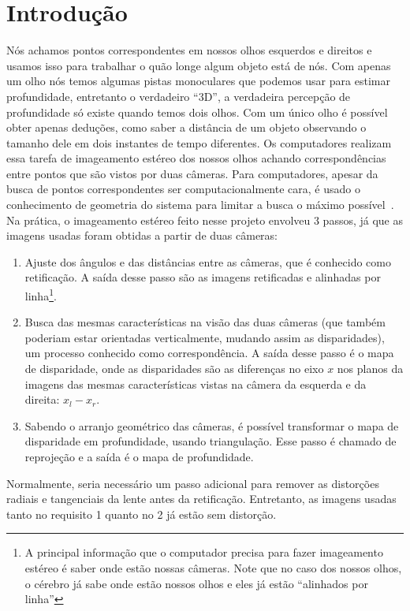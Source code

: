 \documentclass{bmvc2k}
\begin{document}
\section{Introdução}
\label{sec:intro}
Nós achamos pontos correspondentes em nossos olhos esquerdos e direitos e usamos isso para trabalhar o quão longe algum objeto está de nós. Com apenas um olho nós temos algumas pistas monoculares que podemos usar para estimar profundidade, entretanto o verdadeiro ``3D'', a verdadeira percepção de profundidade só existe quando temos dois olhos. Com um único olho é possível obter apenas deduções, como saber a distância de um objeto observando o tamanho dele em dois instantes de tempo diferentes. Os computadores realizam essa tarefa de imageamento estéreo dos nossos olhos achando correspondências entre pontos que são vistos por duas câmeras. Para computadores, apesar da busca de pontos correspondentes ser computacionalmente cara, é usado o conhecimento de geometria do sistema para limitar a busca o máximo possível~\cite{Hartley}. Na prática, o imageamento estéreo feito nesse projeto envolveu 3 passos, já que as imagens usadas foram obtidas a partir de duas câmeras:
\begin{enumerate}
\item Ajuste dos ângulos e das distâncias entre as câmeras, que é conhecido como retificação. A saída desse passo são as imagens retificadas e alinhadas por linha\footnote{A principal informação que o computador precisa para fazer imageamento estéreo é saber onde estão nossas câmeras. Note que no caso dos nossos olhos, o cérebro já sabe onde estão nossos olhos e eles já estão ``alinhados por linha''}.
\item Busca das mesmas características na visão das duas câmeras (que também poderiam estar orientadas verticalmente, mudando assim as disparidades), um processo conhecido como correspondência. A saída desse passo é o mapa de disparidade, onde as disparidades são as diferenças no eixo $x$ nos planos da imagens das mesmas características vistas na câmera da esquerda e da direita: $x_l - x_r$.
\item Sabendo o arranjo geométrico das câmeras, é possível transformar o mapa de disparidade em profundidade, usando triangulação. Esse passo é chamado de reprojeção e a saída é o mapa de profundidade.
\end{enumerate}

Normalmente, seria necessário um passo adicional para remover as distorções radiais e tangenciais da lente antes da retificação. Entretanto, as imagens usadas tanto no requisito 1 quanto no 2 já estão sem distorção.
\end{document}

